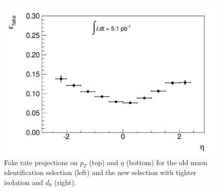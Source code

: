 \begin{figure}[!htbp]
\begin{center}
\includegraphics[scale=0.33]{figures/freta_new.pdf}
\caption{Fake rate projections on $p_T$ (top) and $\eta$ (bottom) for the old muon identification selection (left) and the new selection with tighter isolation and $d_0$ (right).}
\label{fig:mufakerate0}
\end{center}
\end{figure}

